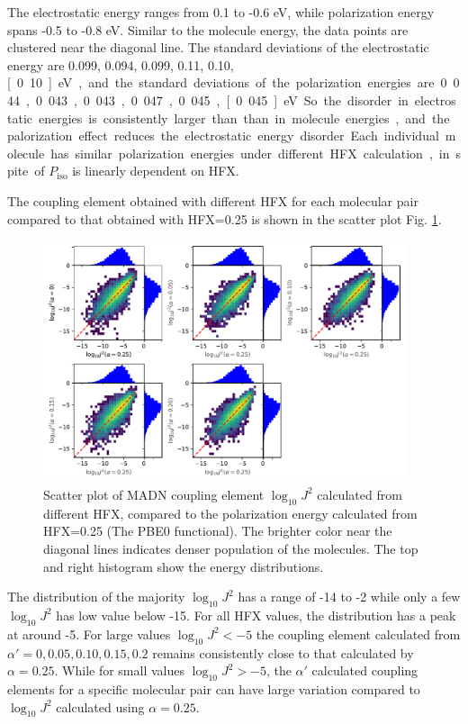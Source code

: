 \documentclass[letterpaper,12pt]{article}
\begin{document}
The electrostatic energy ranges from 0.1 to -0.6 eV, while polarization energy spans -0.5 to -0.8 eV.  Similar to the molecule energy, the data points are clustered near the diagonal line. 
The standard deviations of the electrostatic energy are 0.099, 0.094, 0.099, 0.11, 0.10, \unit[0.10]{eV}, and the standard deviations of the polarization energies are 0.044, 0.043, 0.043, 0.047, 0.045, \unit[0.045]{eV}. So the disorder in electrostatic energies is consistently larger than than in molecule energies, and the palorization effect reduces the electrostatic energy disorder. 
Each individual molecule has similar polarization energies under different HFX calculation, in spite of $P_\text{iso}$ is linearly dependent on HFX. 

The coupling element obtained with different HFX for each molecular pair compared to that obtained with HFX=0.25 is shown in the scatter plot Fig. \ref{fig:J_MADN}.
\begin{figure}[H]
    \centering
    \includegraphics[width=0.95\textwidth]{figs/scatterJ_all.pdf}
    \caption{Scatter plot of MADN coupling element $\log_{10} J^2$ calculated from different HFX, compared to the polarization energy calculated from HFX=0.25 (The PBE0 functional). The brighter color near the diagonal lines indicates denser population of the molecules.  The top and right histogram show the energy distributions.}
    \label{fig:J_MADN}
\end{figure}

The distribution of the majority $\log_{10} J^2$ has a range of -14 to -2 while only a few $\log_{10} J^2$ has low value below -15. For all HFX values, the distribution has a peak at around -5. 
For large values $\log_{10} J^2 < -5$ the coupling element calculated from $\alpha'=0, 0.05, 0.10, 0.15, 0.2$ remains consistently close to that calculated by $\alpha=0.25$. While for small values $\log_{10} J^2 > -5$, the $\alpha'$ calculated coupling elements for a specific molecular pair can have large variation compared to $\log_{10} J^2$ calculated using $\alpha=0.25$.
\end{document}
